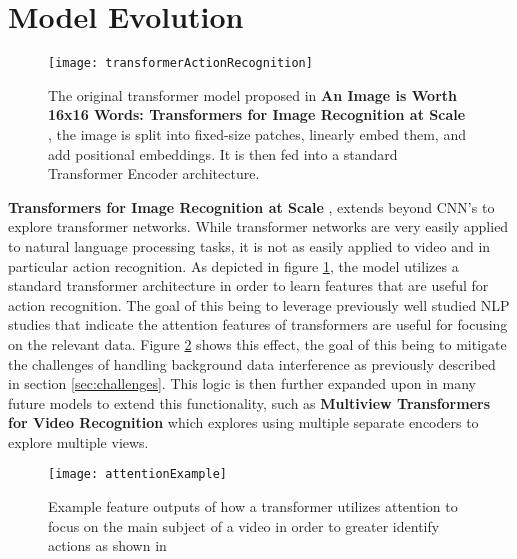 \section{Model Evolution}

\begin{figure}[ht]
	\texttt{[image: transformerActionRecognition]}
	\centering
	\caption{The original transformer model proposed in \textbf{An Image is Worth 16x16 Words: Transformers for Image Recognition at Scale} \cite{transformer_og}, the image is split into fixed-size patches, linearly embed them, and add positional embeddings. It is then fed into a standard Transformer Encoder architecture.}
	\label{fig:transformerActionRecognition}
\end{figure}

\textbf{Transformers for Image Recognition at Scale} \cite{transformer_og}, extends beyond CNN's to explore transformer networks. While transformer networks are very easily applied to natural language processing tasks, it is not as easily applied to video and in particular action recognition. As depicted in figure \ref{fig:transformerActionRecognition}, the model utilizes a standard transformer architecture in order to learn features that are useful for action recognition. The goal of this being to leverage previously well studied NLP studies that indicate the attention features of transformers are useful for focusing on the relevant data. Figure \ref{fig:attentionExample} shows this effect, the goal of this being to mitigate the challenges of handling background data interference as previously described in section \ref{sec:challenges}. This logic is then further expanded upon in many future models to extend this functionality, such as \textbf{Multiview Transformers for Video Recognition} \cite{multiview_transformers} which explores using multiple separate encoders to explore multiple views.

\begin{figure}[ht]
	\texttt{[image: attentionExample]}
	\centering
	\caption{Example feature outputs of how a transformer utilizes attention to focus on the main subject of a video in order to greater identify actions as shown in \cite{transformer_og}}
	\label{fig:attentionExample}
\end{figure}

